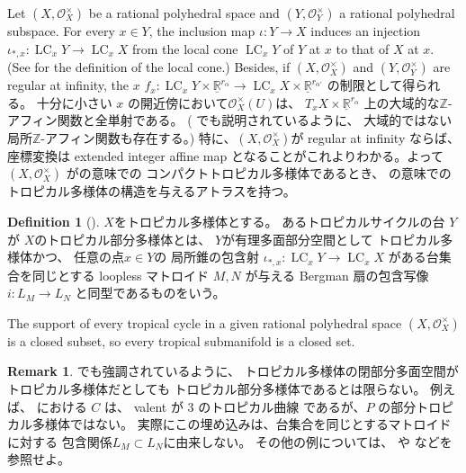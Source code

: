 \documentclass[a4paper,dvipdfmx,reqno,12pt]{amsart}
\theoremstyle{definition}
\newtheorem{definition}[theorem]{Definition}
\newtheorem{remark}[theorem]{Remark}
\newcommand{\opn}[1]{\operatorname{#1}}
\numberwithin{equation}{section}
\begin{document}
Let $(X,\mathcal{O}_X^{\times})$ be a rational
polyhedral space and $(Y,\mathcal{O}_Y^{\times})$
a rational polyhedral subspace.
For every $x\in Y$, 
the inclusion map $\iota\colon Y\to X$ induces
an injection 
$\iota_{*,x}\colon \opn{LC}_x Y\to \opn{LC}_x X$
from the local cone $\opn{LC}_x Y$ of $Y$ at $x$ to 
that of $X$ at $x$.
(See \cite[]{MR4637248} for
the definition of the local cone.)
Besides, if
$(X,\mathcal{O}_X^{\times})$ and
$(Y,\mathcal{O}_Y^{\times})$ are
regular at infinity, 
the $x$
$f_{x}\colon \opn{LC}_x Y\times 
\underline{\mathbb{R}}^{r_{\alpha}}
\to \opn{LC}_x X\times \underline{\mathbb{R}}^{r_{\alpha'}}$
の制限として得られる。
十分に小さい $x$
の開近傍において$\mathcal{O}_X^{\times}(U)$は、
$T_x X\times \underline{\mathbb{R}}^{r_{\alpha}}$
上の大域的な$\mathbb{Z}$-アフィン関数と全単射である。
(\cite[Example 2.1]{MR4637248} でも説明されているように、
大域的ではない局所$\mathbb{Z}$-アフィン関数も存在する。)
特に、$(X,\mathcal{O}_X^{\times})$が regular at infinity
ならば、座標変換は
extended integer affine map \cite[Definition 2.2]{demedrano2023chern}
となることがこれよりわかる。よって
$(X,\mathcal{O}_X^{\times})$ 
が\cite[Definition 6.1]{gross2019sheaftheoretic}の意味での
コンパクトトロピカル多様体であるとき、
\cite[Definition 2.3]{demedrano2023chern}
の意味でのトロピカル多様体の構造を与えるアトラスを持つ。



\begin{definition}[{\cite[Definition 2.14]{demedrano2023chern}}]
$X$をトロピカル多様体とする。
あるトロピカルサイクルの台 $Y$ が
$X$のトロピカル部分多様体とは、
$Y$が有理多面部分空間として
トロピカル多様体かつ、
任意の点$x\in Y$の
局所錐の包含射
$\iota_{*,x}\colon \opn{LC}_x Y\to 
\opn{LC}_x X$
がある台集合を同じとする loopless マトロイド
$M,N$ が与える Bergman 扇の包含写像
$i \colon L_M\to L_N$
と同型であるものをいう。
\end{definition}

The support of every tropical cycle in a given
rational polyhedral space $(X,\mathcal{O}_X^{\times})$ is
a closed subset, so every tropical submanifold is
a closed set.

\begin{remark}
\cite[Example 2.15]{demedrano2023chern}でも強調されているように、
トロピカル多様体の閉部分多面空間がトロピカル多様体だとしても
トロピカル部分多様体であるとは限らない。
例えば、
\cite[Example 2.21]{shaw2015tropical}
における $C$ は、 valent が $3$ のトロピカル曲線
であるが、$P$ の部分トロピカル多様体ではない。
実際にこの埋め込みは、台集合を同じとするマトロイドに対する
包含関係$L_M\subset L_N$に由来しない。
その他の例については、
\cite{MR2594592} や \cite{MR3339531}
などを参照せよ。


\end{remark}
\end{document}
